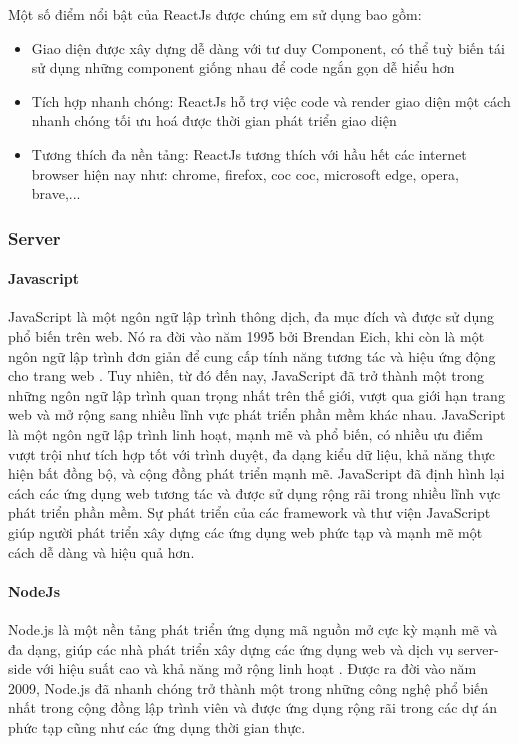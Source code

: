 Một số điểm nổi bật của ReactJs được chúng em sử dụng bao gồm:


\begin{itemize}
  \item Giao diện được xây dựng dễ dàng với tư duy Component, có thể tuỳ biến tái sử dụng những component giống nhau để code ngắn gọn dễ hiểu hơn
  \item Tích hợp nhanh chóng: ReactJs hỗ trợ việc code và render giao diện một cách nhanh chóng tối ưu hoá được thời gian phát triển giao diện
  \item Tương thích đa nền tảng: ReactJs tương thích với hầu hết các internet browser hiện nay như: chrome, firefox, coc coc, microsoft edge, opera, brave,...
\end{itemize}

\subsubsection{Server}
\paragraph{Javascript}
\mbox{}

JavaScript là một ngôn ngữ lập trình thông dịch, đa mục đích và được sử dụng phổ biến trên web. Nó ra đời vào năm 1995 bởi Brendan Eich, khi còn là một ngôn ngữ lập trình đơn giản để cung cấp tính năng tương tác và hiệu ứng động cho trang web \cite{js_1}. Tuy nhiên, từ đó đến nay, JavaScript đã trở thành một trong những ngôn ngữ lập trình quan trọng nhất trên thế giới, vượt qua giới hạn trang web và mở rộng sang nhiều lĩnh vực phát triển phần mềm khác nhau.
JavaScript là một ngôn ngữ lập trình linh hoạt, mạnh mẽ và phổ biến, có nhiều ưu điểm vượt trội như tích hợp tốt với trình duyệt, đa dạng kiểu dữ liệu, khả năng thực hiện bất đồng bộ, và cộng đồng phát triển mạnh mẽ. JavaScript đã định hình lại cách các ứng dụng web tương tác và được sử dụng rộng rãi trong nhiều lĩnh vực phát triển phần mềm. Sự phát triển của các framework và thư viện JavaScript giúp người phát triển xây dựng các ứng dụng web phức tạp và mạnh mẽ một cách dễ dàng và hiệu quả hơn.




\paragraph{NodeJs}
\mbox{}

Node.js là một nền tảng phát triển ứng dụng mã nguồn mở cực kỳ mạnh mẽ và đa dạng, giúp các nhà phát triển xây dựng các ứng dụng web và dịch vụ server-side với hiệu suất cao và khả năng mở rộng linh hoạt \cite{nodejs_1}. Được ra đời vào năm 2009, Node.js đã nhanh chóng trở thành một trong những công nghệ phổ biến nhất trong cộng đồng lập trình viên và được ứng dụng rộng rãi trong các dự án phức tạp cũng như các ứng dụng thời gian thực. 

